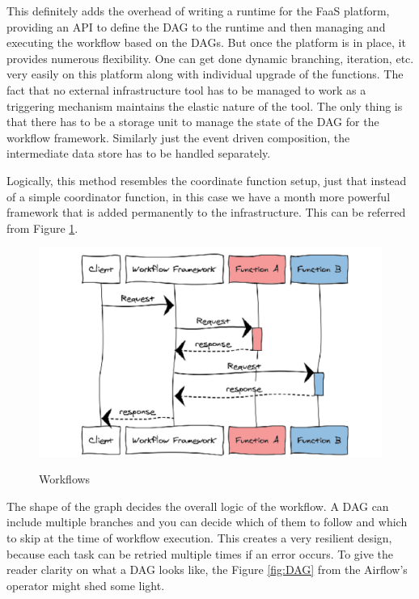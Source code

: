 \documentclass[12pt,titlepage]{article}
\begin{document}
This definitely adds the overhead of writing a runtime for the FaaS platform,
providing an API to define the DAG to the runtime and then managing and
executing the workflow based on the DAGs. But once the platform is in place, it
provides numerous flexibility. One can get done dynamic branching, iteration,
etc. very easily on this platform along with individual upgrade of the
functions. The fact that no external infrastructure tool has to be managed to
work as a triggering mechanism maintains the elastic nature of the tool. The
only thing is that there has to be a storage unit to manage the state of the DAG
for the workflow framework. Similarly just the event driven composition, the
intermediate data store has to be handled separately.

Logically, this method resembles the coordinate function setup, just that
instead of a simple coordinator function, in this case we have a month more
powerful framework that is added permanently to the infrastructure. This can be
referred from Figure \ref{fig:Workflows}.

\begin{figure}
\caption{Workflows}
\centering
\includegraphics[width=150mm]{./thesis_images/workflow_2.png}
\label{fig:Workflows}
\end{figure}

The shape of the graph decides the overall logic of the workflow. A DAG can
include multiple branches and you can decide which of them to follow and which
to skip at the time of workflow execution. This creates a very resilient design,
because each task can be retried multiple times if an error occurs. To give the
reader clarity on what a DAG looks like, the Figure \ref{fig:DAG} from the Airflow's
operator might shed some light.
\end{document}
